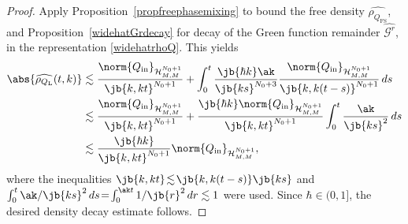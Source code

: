 \begin{proof}
Apply Proposition~\ref{propfreephasemixing} to bound the free density \( \widehat{\rho_{Q_{\mathrm{FS}}}} \), and Proposition~\ref{widehatGrdecay} for decay of the Green function remainder \( \widehat{\mathscr{G}^r} \), in the representation \eqref{widehatrhoQ}. This yields\vspace*{-3pt}
\begin{align*}
\abs{\widehat{\rho_{Q_{\mathrm{L}}}}(t,k)}&\lesssim\frac{\norm{Q_{\mathrm{in}}}_{\mathcal H^{N_0+1}_{M,M}}}{\jb{k, kt}^{N_0+1}}+\int_0^t\frac{\jb{\hbar k}\ak}{\jb{k s}^{N_0+3}}\frac{\norm{Q_{\mathrm{in}}}_{\mathcal H^{N_0+1}_{M,M}}}{\jb{k, k(t-s)}^{N_0+1}}\,ds\\
&\lesssim\frac{\norm{Q_{\mathrm{in}}}_{\mathcal H^{N_0+1}_{M,M}}}{\jb{k,kt}^{N_0+1}}+\frac{\jb{\hbar k}\norm{Q_{\mathrm{in}}}_{\mathcal H^{N_0+1}_{M,M}}}{\jb{k,kt}^{N_0+1}}\int_0^t\frac{\ak}{\jb{k s}^{2}}\,ds\\
&\lesssim\frac{\jb{\hbar k}}{\jb{k,kt}^{N_0+1}}\norm{Q_{\mathrm{in}}}_{\mathcal H^{N_0+1}_{M,M}},
\end{align*}where the inequalities \( \jb{k,kt} \!\lesssim\! \jb{k,k(t-s)}\jb{ks} \) and $\int_0^t\ak/\jb{ks}^2\,ds\!=\!\int_0^{\ak t}1/\jb{r}^2\,dr\lesssim1$ were used. Since \( \hbar \in (0,1] \), the desired density decay estimate follows.


\end{proof}
